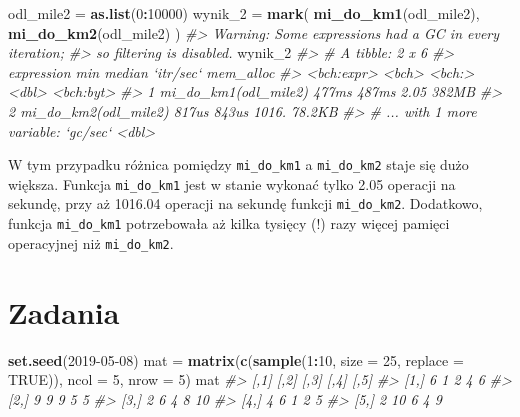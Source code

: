 \documentclass[paper=6in:9in,pagesize=pdftex,headinclude=on,footinclude=on,10pt]{scrbook}
\newenvironment{Shaded}{\begin{snugshade}}{\end{snugshade}}
\newcommand{\CommentTok}[1]{\textcolor[rgb]{0.56,0.35,0.01}{\textit{#1}}}
\newcommand{\DataTypeTok}[1]{\textcolor[rgb]{0.13,0.29,0.53}{#1}}
\newcommand{\DecValTok}[1]{\textcolor[rgb]{0.00,0.00,0.81}{#1}}
\newcommand{\KeywordTok}[1]{\textcolor[rgb]{0.13,0.29,0.53}{\textbf{#1}}}
\newcommand{\NormalTok}[1]{#1}
\newcommand{\OperatorTok}[1]{\textcolor[rgb]{0.81,0.36,0.00}{\textbf{#1}}}
\newcommand{\OtherTok}[1]{\textcolor[rgb]{0.56,0.35,0.01}{#1}}
\newcommand{\StringTok}[1]{\textcolor[rgb]{0.31,0.60,0.02}{#1}}
\begin{document}
\begin{Shaded}
\begin{Highlighting}[]
\NormalTok{odl_mile2 =}\StringTok{ }\KeywordTok{as.list}\NormalTok{(}\DecValTok{0}\OperatorTok{:}\DecValTok{10000}\NormalTok{)}
\NormalTok{wynik_}\DecValTok{2}\NormalTok{ =}\StringTok{ }\KeywordTok{mark}\NormalTok{(}
  \KeywordTok{mi_do_km1}\NormalTok{(odl_mile2),}
  \KeywordTok{mi_do_km2}\NormalTok{(odl_mile2)}
\NormalTok{)}
\CommentTok{#> Warning: Some expressions had a GC in every iteration;}
\CommentTok{#> so filtering is disabled.}
\NormalTok{wynik_}\DecValTok{2}
\CommentTok{#> # A tibble: 2 x 6}
\CommentTok{#>   expression             min median `itr/sec` mem_alloc}
\CommentTok{#>   <bch:expr>           <bch> <bch:>     <dbl> <bch:byt>}
\CommentTok{#> 1 mi_do_km1(odl_mile2) 477ms  487ms      2.05     382MB}
\CommentTok{#> 2 mi_do_km2(odl_mile2) 817us  843us   1016.      78.2KB}
\CommentTok{#> # ... with 1 more variable: `gc/sec` <dbl>}
\end{Highlighting}
\end{Shaded}

W tym przypadku różnica pomiędzy \texttt{mi\_do\_km1} a \texttt{mi\_do\_km2} staje się dużo większa.
Funkcja \texttt{mi\_do\_km1} jest w stanie wykonać tylko 2.05 operacji na sekundę, przy aż 1016.04 operacji na sekundę funkcji \texttt{mi\_do\_km2}.
Dodatkowo, funkcja \texttt{mi\_do\_km1} potrzebowała aż kilka tysięcy (!) razy więcej pamięci operacyjnej niż \texttt{mi\_do\_km2}.

\hypertarget{zadania-10}{%
\section{Zadania}\label{zadania-10}}

\begin{Shaded}
\begin{Highlighting}[]
\KeywordTok{set.seed}\NormalTok{(}\DecValTok{2019-05-08}\NormalTok{)}
\NormalTok{mat =}\StringTok{ }\KeywordTok{matrix}\NormalTok{(}\KeywordTok{c}\NormalTok{(}\KeywordTok{sample}\NormalTok{(}\DecValTok{1}\OperatorTok{:}\DecValTok{10}\NormalTok{, }\DataTypeTok{size =} \DecValTok{25}\NormalTok{, }\DataTypeTok{replace =} \OtherTok{TRUE}\NormalTok{)),}
             \DataTypeTok{ncol =} \DecValTok{5}\NormalTok{, }\DataTypeTok{nrow =} \DecValTok{5}\NormalTok{)}
\NormalTok{mat}
\CommentTok{#>      [,1] [,2] [,3] [,4] [,5]}
\CommentTok{#> [1,]    6    1    2    4    6}
\CommentTok{#> [2,]    9    9    9    5    5}
\CommentTok{#> [3,]    2    6    4    8   10}
\CommentTok{#> [4,]    4    6    1    2    5}
\CommentTok{#> [5,]    2   10    6    4    9}
\end{Highlighting}
\end{Shaded}
\end{document}
